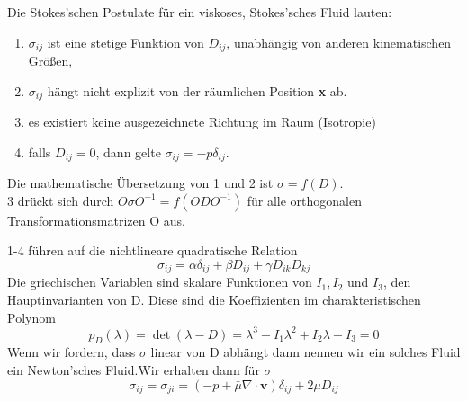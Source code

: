 \documentclass[
	11pt, %
]{beamer}
\begin{document}
\begin{frame}
	Die Stokes'schen Postulate f\"ur ein viskoses, Stokes'sches Fluid lauten:
	\begin{enumerate}
		\item $\sigma_{ij}$ ist eine stetige Funktion von $D_{ij}$, unabh\"angig von anderen kinematischen Gr\"o{\ss}en,
		\item $\sigma_{ij}$ h\"angt nicht explizit von der r\"aumlichen Position \textbf{x} ab.
		\item es existiert keine ausgezeichnete Richtung im Raum (Isotropie)
		\item falls $D_{ij}=0$, dann gelte $\sigma_{ij}=-p\delta_{ij}$.
	\end{enumerate}
	Die mathematische \"Ubersetzung von 1 und 2 ist $\sigma=f\left(D\right)$.\\
	3 dr\"uckt sich durch $O\sigma O^{-1}=f\left(ODO^{-1}\right)$ f\"ur alle orthogonalen Transformationsmatrizen O aus.
\end{frame}
\begin{frame}
	1-4 f\"uhren auf die nichtlineare quadratische Relation
	\begin{equation}
		\sigma_{ij}=\alpha\delta_{ij}+\beta D_{ij}+\gamma D_{ik}D_{kj}
	\end{equation}
	Die griechischen Variablen sind skalare Funktionen von $I_1, I_2$ und $I_3$, den Hauptinvarianten von D. Diese sind die Koeffizienten im charakteristischen Polynom
	\begin{equation}
		p_D(\lambda)=\operatorname{det}(\lambda-D)=\lambda^3-I_1 \lambda^2+I_2 \lambda-I_3=0
	\end{equation}
	Wenn wir fordern, dass $\sigma$ linear von D abh\"angt dann nennen wir ein solches Fluid ein Newton'sches Fluid.Wir erhalten dann f\"ur $\sigma$
	\begin{equation}
		\sigma_{ij}=\sigma_{ji}=\left(-p+\bar{\mu}\nabla\cdot\textbf{v}\right)\delta_{ij}+2\mu D_{ij}
	\end{equation}
\end{frame}
\end{document}
